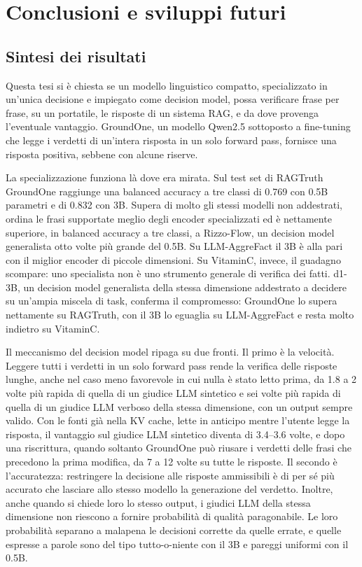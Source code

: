 \chapter{Conclusioni e sviluppi futuri}
\label{sec:conclusion}

\section{Sintesi dei risultati}
\label{sec:concl-summary}

Questa tesi si è chiesta se un modello linguistico compatto, specializzato in un'unica decisione e impiegato come
decision model, possa verificare frase per frase, su un portatile, le risposte di un sistema RAG, e da dove provenga
l'eventuale vantaggio. GroundOne, un modello Qwen2.5 sottoposto a fine-tuning che legge i verdetti di un'intera risposta
in un solo forward pass, fornisce una risposta positiva, sebbene con alcune riserve.

La specializzazione funziona là dove era mirata. Sul test set di RAGTruth GroundOne raggiunge una balanced accuracy a tre
classi di 0.769 con 0.5B parametri e di 0.832 con 3B. Supera di molto gli stessi modelli non addestrati, ordina le frasi
supportate meglio degli encoder specializzati ed è nettamente superiore, in balanced accuracy a tre classi, a Rizzo-Flow, un decision model generalista otto volte più grande del 0.5B. Su LLM-AggreFact il 3B è alla pari con il miglior encoder di piccole dimensioni. Su VitaminC, invece,
il guadagno scompare: uno specialista non è uno strumento generale di verifica dei fatti. d1-3B, un decision model
generalista della stessa dimensione addestrato a decidere su un'ampia miscela di task, conferma il compromesso: GroundOne lo supera nettamente su RAGTruth, con il 3B lo eguaglia su LLM-AggreFact e resta molto indietro su VitaminC.

Il meccanismo del decision model ripaga su due fronti. Il primo è la velocità. Leggere tutti i verdetti in un solo forward pass
rende la verifica delle risposte lunghe, anche nel caso meno favorevole in cui nulla è stato letto prima, da 1.8 a 2 volte più rapida di quella di un giudice LLM sintetico e sei volte più rapida di quella di un giudice LLM verboso della stessa dimensione, con un output sempre valido. Con le fonti già nella KV cache, lette in anticipo mentre l'utente legge la risposta, il vantaggio sul giudice LLM sintetico diventa di 3.4--3.6 volte, e dopo una riscrittura, quando soltanto GroundOne può riusare i verdetti delle frasi che precedono la prima modifica, da 7 a 12 volte su tutte le risposte. Il secondo è
l'accuratezza: restringere la decisione alle risposte ammissibili è di per sé più accurato che lasciare allo stesso
modello la generazione del verdetto. Inoltre, anche quando si chiede loro lo stesso output, i giudici LLM della stessa dimensione non riescono a fornire probabilità di qualità paragonabile. Le loro probabilità separano a malapena le decisioni corrette da quelle errate, e quelle espresse a parole sono del tipo tutto-o-niente con il 3B e pareggi uniformi con il 0.5B.

